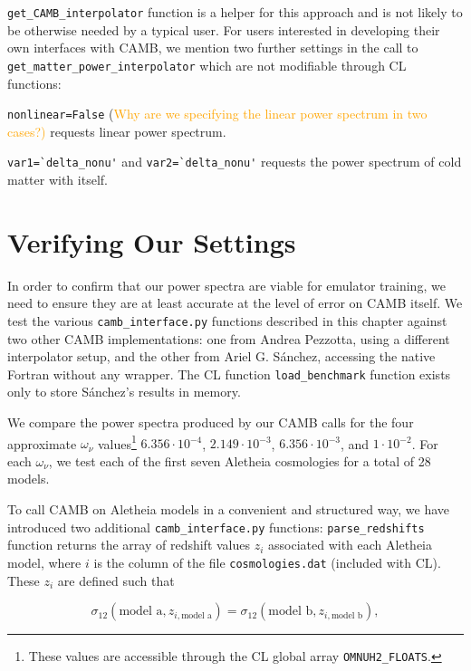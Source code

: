 \verb|get_CAMB_interpolator| function is a helper for this approach and is not 
likely to be otherwise needed by a typical user. For users interested in
developing their own interfaces with CAMB, we mention two further
settings in the call to \verb|get_matter_power_interpolator| which are not
modifiable through CL functions:

\verb|nonlinear=False| (\textcolor{orange}{Why are we specifying the linear
power spectrum in two cases?)} \quad requests linear power spectrum.

\verb|var1=`delta_nonu'| and \verb|var2=`delta_nonu'| requests the power
spectrum of cold matter with itself.


\section{Verifying Our Settings}
\label{sec: CAMB_validation}

In order to confirm that our power spectra are viable for emulator training,
we need to ensure they are at least accurate at the level of error on CAMB
itself. We test the various \verb|camb_interface.py| functions described in
this chapter against two other CAMB implementations: one from Andrea Pezzotta,
using a different interpolator setup, and the other from Ariel G. S\'{a}nchez,
accessing the native Fortran without any wrapper. The CL function
\verb|load_benchmark| function exists only to store S\'{a}nchez's results in
memory.

We compare the power spectra produced by our CAMB calls for the four
approximate $\omega_\nu$ values\footnote{These values are
accessible through the CL global array \verb|OMNUH2_FLOATS|.}
$6.356 \cdot 10^{-4}$, $2.149 \cdot 10^{-3}$,
$6.356 \cdot 10^{-3}$, and $1 \cdot 10^{-2}$. For each
$\omega_\nu$, we test each of the first seven Aletheia cosmologies for 
a total of 28 models.

To call CAMB on Aletheia models in a convenient and structured way, we have
introduced two additional \verb|camb_interface.py| functions:
\verb|parse_redshifts| function returns the array of redshift values $z_i$
associated with each Aletheia model, where $i$ is the column of the file
\verb|cosmologies.dat| (included with CL). These $z_i$ are defined such that

\begin{equation}
\sigma_{12}(\text{model a}, z_{i, \text{model a}})
=
\sigma_{12}(\text{model b}, z_{i, \text{model b}})
,\end{equation}

